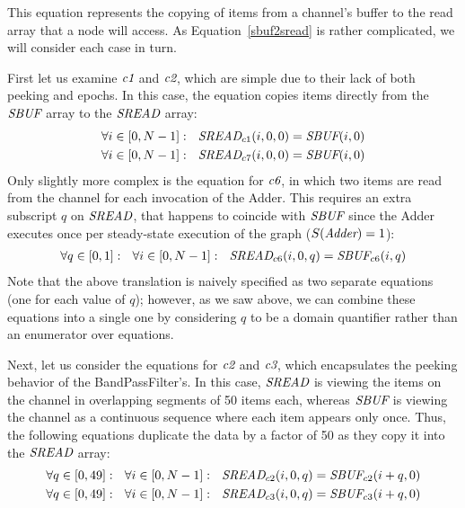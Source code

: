
This equation represents the copying of items from a channel's buffer
to the read array that a node will access.  As
Equation~\ref{sbuf2sread} is rather complicated, we will consider each
case in turn.  

First let us examine $\mbox{\it c1}$ and $\mbox{\it c2}$, which are simple due to
their lack of both peeking and epochs.  In this case, the equation
copies items directly from the $\mbox{\it SBUF}$ array to the $\mbox{\it SREAD}$
array:
\begin{align*}
\forall i \in [0,N-1]:~~\mbox{\it SREAD}_{c1}(i,0,0) = \mbox{\it SBUF}(i,0) \\
\forall i \in [0,N-1]:~~\mbox{\it SREAD}_{c7}(i,0,0) = \mbox{\it SBUF}(i,0)
\end{align*}
Only slightly more complex is the equation for $\mbox{\it c6}$, in which two
items are read from the channel for each invocation of the Adder.
This requires an extra subscript $q$ on $\mbox{\it SREAD}$, that happens to
coincide with $\mbox{\it SBUF}$ since the Adder executes once per
steady-state execution of the graph ($S(\mbox{\it Adder}) = 1$):
\begin{align*}
\forall q \in [0,1]:~~\forall i \in [0,N-1]:~~\mbox{\it SREAD}_{c6}(i,0,q) = \mbox{\it SBUF}_{c6}(i,q)
\end{align*}
Note that the above translation is naively specified as two separate
equations (one for each value of $q$); however, as we saw above, we
can combine these equations into a single one by considering $q$ to be
a domain quantifier rather than an enumerator over equations.

Next, let us consider the equations for $\mbox{\it c2}$ and $\mbox{\it c3}$, which
encapsulates the peeking behavior of the BandPassFilter's.  In this
case, $\mbox{\it SREAD}$ is viewing the items on the channel in overlapping
segments of 50 items each, whereas $\mbox{\it SBUF}$ is viewing the channel
as a continuous sequence where each item appears only once.  Thus, the
following equations duplicate the data by a factor of 50 as they copy
it into the $\mbox{\it SREAD}$ array:
\begin{align*}
\forall q \in [0,49]:~~\forall i \in [0,N-1]:~~\mbox{\it SREAD}_{c2}(i,0,q) = \mbox{\it SBUF}_{c2}(i+q,0) \\
\forall q \in [0,49]:~~\forall i \in [0,N-1]:~~\mbox{\it SREAD}_{c3}(i,0,q) = \mbox{\it SBUF}_{c3}(i+q,0)
\end{align*}

